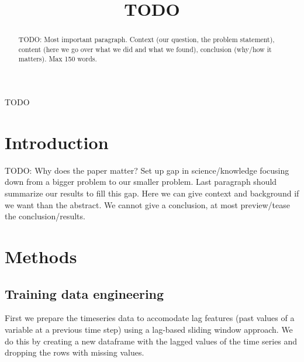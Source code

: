 \documentclass[conference]{IEEEtran}
\begin{document}
\title{TODO}

\author{
\and
{}
\and
{}
\and
{}
}

\maketitle

\begin{abstract}
TODO: Most important paragraph. Context (our question, the problem statement), content (here we go 
over what we did and what we found), conclusion (why/how it matters). Max 150 words.
\end{abstract}

\begin{IEEEkeywords}
TODO
\end{IEEEkeywords}

\section{Introduction}

TODO: Why does the paper matter? Set up gap in science/knowledge focusing down from a bigger 
problem to our smaller problem. Last paragraph should summarize our results to fill this gap. Here 
we can give context and background if we want than the abstract. We cannot give a conclusion, at 
most preview/tease the conclusion/results.


\section{Methods}
\subsection{Training data engineering}
First we prepare the timeseries data to accomodate lag features (past values of a variable at a
previous time step) using a lag-based sliding window approach. We do this by creating a new 
dataframe with the lagged values of the time series and dropping the rows with missing values.
\end{document}
